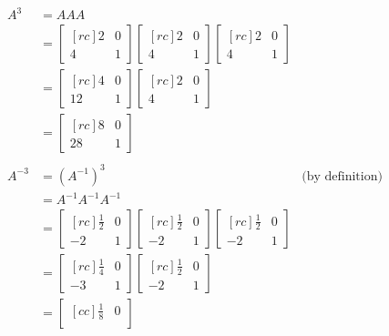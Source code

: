 \\
\begin{solution}
\begin{align*}
A^3&=AAA\\
&=
\begin{bmatrix}[rc]
2&0\\
4&1
\end{bmatrix}
\begin{bmatrix}[rc]
2&0\\
4&1
\end{bmatrix} 
\begin{bmatrix}[rc]
2&0\\
4&1
\end{bmatrix} 
\\
&=
\begin{bmatrix}[rc]
4&0\\
12&1
\end{bmatrix} 
\begin{bmatrix}[rc]
2&0\\
4&1
\end{bmatrix}
\\
&=
\begin{bmatrix}[rc]
8&0\\
28&1
\end{bmatrix} 
\\ \\
A^{-3}&=(A^{-1})^3 &\text{(by definition)}\\
&=A^{-1}A^{-1}A^{-1}\\
&=
\begin{bmatrix}[rc]
\frac{1}{2}&0\\
-2&1
\end{bmatrix} 
\begin{bmatrix}[rc]
\frac{1}{2}&0\\
-2&1
\end{bmatrix} 
\begin{bmatrix}[rc]
\frac{1}{2}&0\\
-2&1
\end{bmatrix} \\
&=
\begin{bmatrix}[rc]
\frac{1}{4}&0\\
-3&1
\end{bmatrix} 
\begin{bmatrix}[rc]
\frac{1}{2}&0\\
-2&1
\end{bmatrix} 
\\
&=
\begin{bmatrix}[cc]
\frac{1}{8}&0\\

\end{bmatrix}
\end{align*}
\end{solution}
